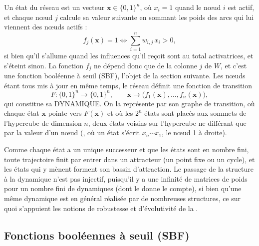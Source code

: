 \documentclass[12pt, a4paper]{article}
\begin{document}
Un état du réseau est un vecteur $\mathbf{x} \in \{0,1\}^n$, où $x_i = 1$ quand le nœud $i$ est actif, et chaque nœud $j$ calcule sa valeur suivante en sommant les poids des arcs qui lui viennent des nœuds actifs :
\begin{equation}
f_j(\mathbf{x}) = 1 \iff \sum_{i=1}^{n} w_{i,j}\, x_i > 0 ,
\end{equation}
si bien qu'il s'allume quand les influences qu'il reçoit sont au total activatrices, et s'éteint sinon.
La fonction $f_j$ ne dépend donc que de la colonne $j$ de $W$, et c'est une fonction booléenne à seuil (SBF), l'objet de la section suivante.
Les nœuds étant tous mis à jour en même temps, le réseau définit une fonction de transition
\begin{equation}
F : \{0,1\}^n \to \{0,1\}^n, \qquad \mathbf{x} \mapsto \big(f_1(\mathbf{x}), \dots, f_n(\mathbf{x})\big),
\end{equation}
qui constitue sa DYNAMIQUE.
On la représente par son graphe de transition, où chaque état $\mathbf{x}$ pointe vers $F(\mathbf{x})$ et où les $2^n$ états sont placés aux sommets de l'hypercube de dimension $n$, deux états voisins sur l'hypercube ne différant que par la valeur d'un nœud (, où un état s'écrit $x_n \cdots x_1$, le nœud 1 à droite).

Comme chaque état a un unique successeur et que les états sont en nombre fini, toute trajectoire finit par entrer dans un attracteur (un point fixe ou un cycle), et les états qui y mènent forment son bassin d'attraction.
Le passage de la structure à la dynamique n'est pas injectif, puisqu'il y a une infinité de matrices de poids pour un nombre fini de dynamiques (dont le  donne le compte), si bien qu'une même dynamique est en général réalisée par de nombreuses structures, ce sur quoi s'appuient les notions de robustesse et d'évolutivité de la .


\subsection{Fonctions booléennes à seuil (SBF)}
\label{sec:sbf}
\end{document}
